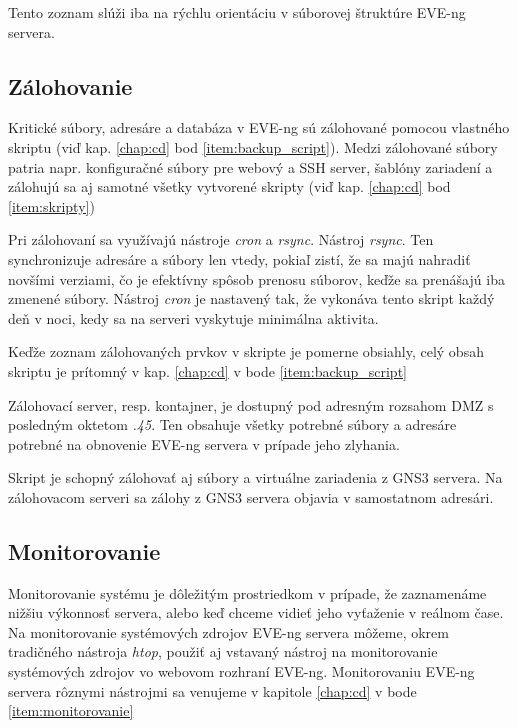 Tento zoznam slúži iba na rýchlu orientáciu v súborovej štruktúre EVE-ng servera.




\subsection{Zálohovanie}
\label{chap:zalohovanie}

Kritické súbory, adresáre a databáza v EVE-ng sú zálohované pomocou vlastného skriptu (viď kap. \ref{chap:cd} bod \ref{item:backup_script}). Medzi zálohované súbory patria napr. konfiguračné súbory pre webový a SSH server, šablóny zariadení a zálohujú sa aj samotné všetky vytvorené skripty (viď kap. \ref{chap:cd} bod \ref{item:skripty})

Pri zálohovaní sa využívajú nástroje \emph{cron} a \emph{rsync}. Nástroj \emph{rsync}. Ten synchronizuje adresáre a súbory len vtedy, pokiaľ zistí, že sa majú nahradiť novšími verziami, čo je efektívny spôsob prenosu súborov, keďže sa prenášajú iba zmenené súbory. Nástroj \emph{cron} je nastavený tak, že vykonáva tento skript každý deň v noci, kedy sa na serveri vyskytuje minimálna aktivita.

Keďže zoznam zálohovaných prvkov v skripte je pomerne obsiahly, celý obsah skriptu je prítomný v kap. \ref{chap:cd} v bode \ref{item:backup_script}

Zálohovací server, resp. kontajner, je dostupný pod adresným rozsahom DMZ s posledným oktetom \emph{.45}. Ten obsahuje všetky potrebné súbory a adresáre potrebné na obnovenie EVE-ng servera v prípade jeho zlyhania.

Skript je schopný zálohovať aj súbory a virtuálne zariadenia z GNS3 servera. Na zálohovacom serveri sa zálohy z GNS3 servera objavia v samostatnom adresári.





\subsection{Monitorovanie}

Monitorovanie systému je dôležitým prostriedkom v prípade, že zaznamenáme nižšiu výkonnosť servera, alebo keď chceme vidieť jeho vyťaženie v reálnom čase. Na monitorovanie systémových zdrojov EVE-ng servera môžeme, okrem tradičného nástroja \emph{htop}, použiť aj vstavaný nástroj na monitorovanie systémových zdrojov vo webovom rozhraní EVE-ng. Monitorovaniu EVE-ng servera rôznymi nástrojmi sa venujeme v kapitole \ref{chap:cd} v bode \ref{item:monitorovanie}

